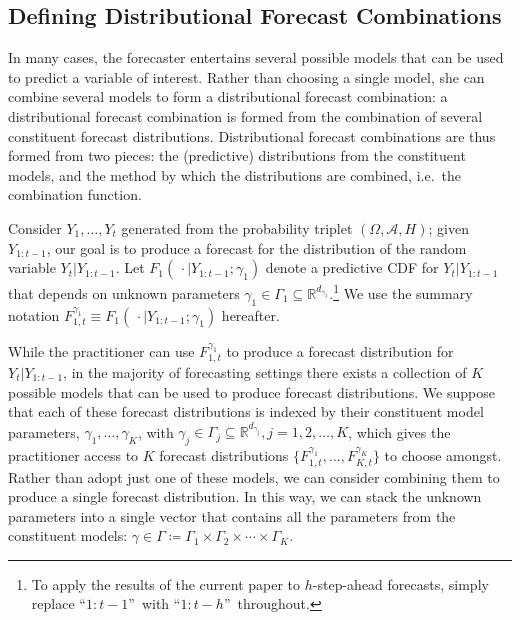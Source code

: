 \documentclass[12pt]{article}
\theoremstyle{definition}
\theoremstyle{remark}
\begin{document}
{\subsection{Defining Distributional Forecast Combinations\label{subsec:comb}}

In many cases, the forecaster entertains several possible models that can be used to predict a variable of interest. Rather than choosing a single model, she can combine several models to form a distributional forecast combination: a distributional forecast combination is formed from the combination of several constituent forecast distributions. Distributional forecast combinations are thus formed from two pieces: the (predictive) distributions from the constituent models, and the method by which the distributions are combined, i.e.\ the combination function.

Consider $Y_{1},\dots ,Y_{t}$ generated from the probability triplet $(\Omega ,\mathcal{A},H)$; given $Y_{1:t-1}$, our goal is to produce a forecast for the distribution of the random variable $Y_{t}|Y_{1:t-1}$. Let $F_{1}(\,\cdot \mid Y_{1:t-1};\gamma _{1})$ denote a predictive CDF for $Y_{t}|Y_{1:t-1}$ that depends on unknown parameters $\gamma _{1}\in \Gamma_{1}\subseteq \mathbb{R}^{d_{\gamma _{1}}}$.\footnote{\scriptsize To apply the results of the current paper to $h$-step-ahead forecasts, simply replace \textquotedblleft $\scriptstyle{1:t-1}$\textquotedblright\ with \textquotedblleft $\scriptstyle{1:t-h}$\textquotedblright\ throughout.} We use the summary notation $F_{1,t}^{\gamma _{1}} \equiv F_{1}(\,\cdot \mid Y_{1:t-1};\gamma _{1})$ hereafter.

While the practitioner can use $F_{1,t}^{\gamma _{1}}$ to produce a forecast distribution for $Y_{t}|Y_{1:t-1}$, in the majority of forecasting settings there exists a collection of $K$ possible models that can be used to produce forecast distributions. We suppose that each of these forecast distributions is indexed by their constituent model parameters, $\gamma _{1},\dots ,\gamma_{K}$, with $\gamma _{j}\in \Gamma _{j}\subseteq \mathbb{R}^{d_{\gamma_{j}}},j=1,2,\ldots ,K$, which gives the practitioner access to $K$ forecast distributions $\{F_{1,t}^{\gamma _{1}},\dots ,F_{K,t}^{\gamma _{K}}\}$ to choose amongst. Rather than adopt just one of these models, we can consider combining them to produce a single forecast distribution. In this way, we can stack the unknown parameters into a single vector that contains all the parameters from the constituent models: $\gamma \in \Gamma \coloneqq\Gamma_{1}\times \Gamma _{2}\times \cdots \times \Gamma _{K}$.

}
\end{document}
